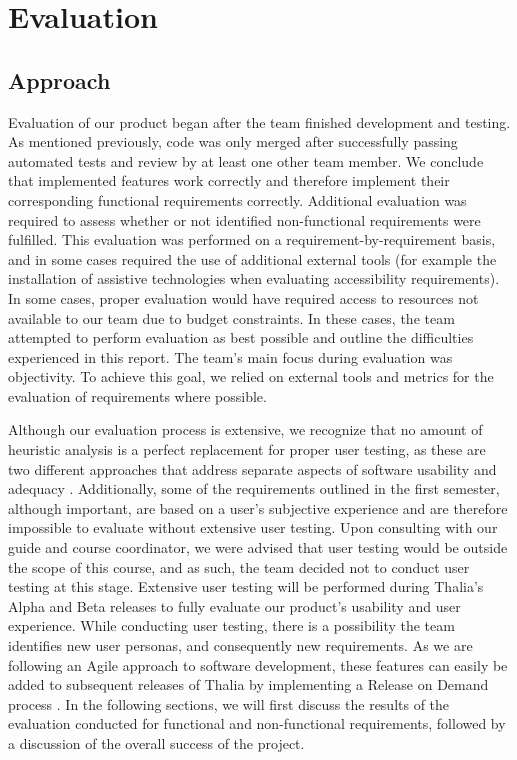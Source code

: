\documentclass[main.tex]{subfiles}
\begin{document}
\section{Evaluation}

\subsection{Approach}
Evaluation of our product began after the team finished development and testing. As mentioned previously, code was only merged after successfully passing automated tests and review by at least one other team member. We conclude that implemented features work correctly and therefore implement their corresponding functional requirements correctly. Additional evaluation was required to assess whether or not identified non-functional requirements were fulfilled. This evaluation was performed on a requirement-by-requirement basis, and in some cases required the use of additional external tools (for example the installation of assistive technologies when evaluating accessibility requirements). In some cases, proper evaluation would have required access to resources not available to our team due to budget constraints. In these cases, the team attempted to perform evaluation as best possible and outline the difficulties experienced in this report. The team's main focus during evaluation was objectivity. To achieve this goal, we relied on external tools and metrics for the evaluation of requirements where possible.

Although our evaluation process is extensive, we recognize that no amount of heuristic analysis is a perfect replacement for proper user testing, as these are two different approaches that address separate aspects of software usability and adequacy \cite{userTestingGood}. Additionally, some of the requirements outlined in the first semester, although important, are based on a user's subjective experience and are therefore impossible to evaluate without extensive user testing. Upon consulting with our guide and course coordinator, we were advised that user testing would be outside the scope of this course, and as such, the team decided not to conduct user testing at this stage. Extensive user testing will be performed during Thalia’s Alpha and Beta releases to fully evaluate our product's usability and user experience. While conducting user testing, there is a possibility the team identifies new user personas, and consequently new requirements. As we are following an Agile approach to software development, these features can easily be added to subsequent releases of Thalia by implementing a Release on Demand process \cite{releaseOnDemand}.
In the following sections, we will first discuss the results of the evaluation conducted for functional and non-functional requirements, followed by a discussion of the overall success of the project.
\end{document}
